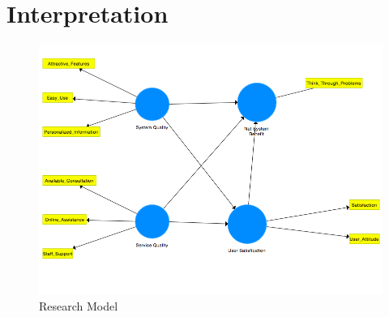 \section{Interpretation}
\label{sec:vergleich}
\lipsum[11]

\begin{figure}[h]
\centering
\includegraphics[width=1\textwidth]{Grafiken/Research_Model.png}
\caption{Research Model}
\label{Research Model}
\end{figure}